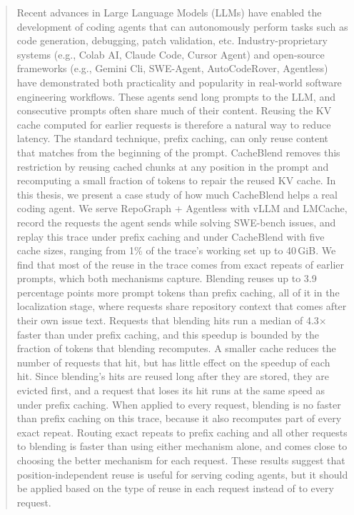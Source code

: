 \documentclass[12pt,openany]{cmuthesis}
\begin{document}
\maketitle
\begin{abstract}
Recent advances in Large Language Models (LLMs) have enabled the development of coding agents that can autonomously perform tasks such as code generation, debugging, patch validation, etc. Industry-proprietary systems (e.g., Colab AI, Claude Code, Cursor Agent) and open-source frameworks (e.g., Gemini Cli, SWE-Agent, AutoCodeRover, Agentless) have demonstrated both practicality and popularity in real-world software engineering workflows. These agents send long prompts to the LLM, and consecutive prompts often share much of their content. Reusing the KV cache computed for earlier requests is therefore a natural way to reduce latency. The standard technique, prefix caching, can only reuse content that matches from the beginning of the prompt. CacheBlend removes this restriction by reusing cached chunks at any position in the prompt and recomputing a small fraction of tokens to repair the reused KV cache. In this thesis, we present a case study of how much CacheBlend helps a real coding agent. We serve RepoGraph + Agentless with vLLM and LMCache, record the requests the agent sends while solving SWE-bench issues, and replay this trace under prefix caching and under CacheBlend with five cache sizes, ranging from 1\% of the trace's working set up to 40\,GiB. We find that most of the reuse in the trace comes from exact repeats of earlier prompts, which both mechanisms capture. Blending reuses up to 3.9 percentage points more prompt tokens than prefix caching, all of it in the localization stage, where requests share repository context that comes after their own issue text. Requests that blending hits run a median of 4.3$\times$ faster than under prefix caching, and this speedup is bounded by the fraction of tokens that blending recomputes. A smaller cache reduces the number of requests that hit, but has little effect on the speedup of each hit. Since blending's hits are reused long after they are stored, they are evicted first, and a request that loses its hit runs at the same speed as under prefix caching. When applied to every request, blending is no faster than prefix caching on this trace, because it also recomputes part of every exact repeat. Routing exact repeats to prefix caching and all other requests to blending is faster than using either mechanism alone, and comes close to choosing the better mechanism for each request. These results suggest that position-independent reuse is useful for serving coding agents, but it should be applied based on the type of reuse in each request instead of to every request.
\end{abstract}
\end{document}
